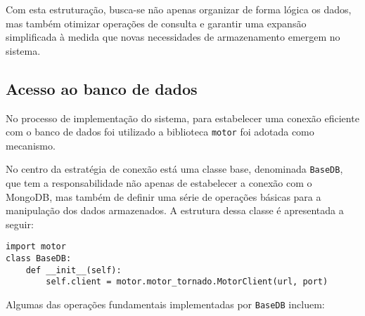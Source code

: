 Com esta estruturação, busca-se não apenas organizar de forma lógica os dados, mas também otimizar operações de consulta e garantir uma expansão simplificada à medida que novas necessidades de armazenamento emergem no sistema.


\subsection[Acesso ao banco de dados]{Acesso ao banco de dados}

No processo de implementação do sistema, para estabelecer uma conexão eficiente com o banco de dados foi utilizado a biblioteca \texttt{motor} foi adotada como mecanismo.

No centro da estratégia de conexão está uma classe base, denominada \texttt{BaseDB}, que tem a responsabilidade não apenas de estabelecer a conexão com o MongoDB, mas também de definir uma série de operações básicas para a manipulação dos dados armazenados. A estrutura dessa classe é apresentada a seguir:

\begin{verbatim}
import motor
class BaseDB:
    def __init__(self):
        self.client = motor.motor_tornado.MotorClient(url, port)
\end{verbatim}

Algumas das operações fundamentais implementadas por \texttt{BaseDB} incluem:

